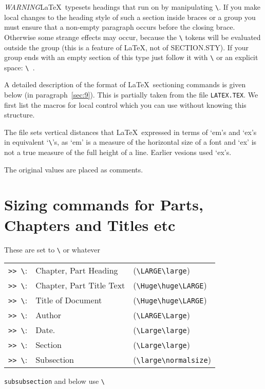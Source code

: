 \documentclass[pagesize=auto, numbers=enddot]{scrartcl}
\makeatletter
\newcommand*{\pkg}[1]{\textsf{#1}}
\newcommand*{\cs}[1]{\texttt{\textbackslash#1}}
\newcommand*{\cmd}[1]{\cs{\expandafter\@gobble\string#1}}
\makeatother
\begin{document}
\emph{WARNING}\quad\LaTeX\ typesets headings that run on by manipulating \cmd{\everypar}. If you
make local changes to the heading style of such a section inside braces or a
group you must ensure that a non-empty paragraph occurs before the closing
brace. Otherwise some strange effects may occur, because the \cmd{\everypar} tokens
will be evaluated outside the group (this is a feature of \LaTeX, not of
\pkg{SECTION.STY}). If your group ends with an empty section of this type just
follow it with \cmd{\leavevmode} or an explicit space: \verb*|\ |.

A detailed description of the format of \LaTeX\ sectioning commands is given
below (in paragraph~\ref{sec:9}). This is partially taken from the file \texttt{LATEX.TEX}.
We first list the macros for local control which you can use without knowing
this structure.

The file sets vertical distances that \LaTeX\ expressed in terms of `em's and
`ex's in equivalent `\cmd{\baselineskip}'s, as `em' is a measure of the horizontal
size of a font and `ex' is not a true measure of the full height of a line.
Earlier vesions used `ex's.

The original values are placed as comments.


\section{Sizing commands for Parts, Chapters and Titles etc}

These are set to \cmd{\large} or whatever
%
\begin{flushleft}
  \begin{tabular}{@{}>{\texttt{>{}> }}lll@{}}
    \cmd{\chsize}:  & Chapter, Part Heading    & (\verb|\LARGE\large|)     \\
    \cmd{\hdsize}:  & Chapter, Part Title Text & (\verb|\Huge\huge\LARGE|) \\
    \cmd{\ttsize}:  & Title of Document        & (\verb|\Huge\huge\LARGE|) \\
    \cmd{\ausize}:  & Author                   & (\verb|\LARGE\Large|)     \\
    \cmd{\dasize}:  & Date.                    & (\verb|\Large\large|)     \\
    \cmd{\secsize}: & Section                  & (\verb|\Large\large|)     \\
    \cmd{\subsize}: & Subsection               & (\verb|\large\normalsize|)
  \end{tabular}
\end{flushleft}
%
\texttt{subsubsection} and below use \cmd{\normalsize}
\end{document}
